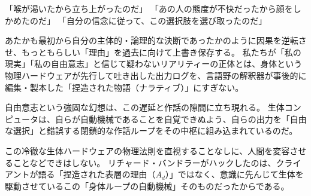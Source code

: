 「喉が渇いたから立ち上がったのだ」
「あの人の態度が不快だったから顔をしかめたのだ」
「自分の信念に従って、この選択肢を選び取ったのだ」

あたかも最初から自分の主体的・論理的な決断であったかのように因果を逆転させ、もっともらしい「理由」を過去に向けて上書き保存する。
私たちが「私の現実」「私の自由意志」と信じて疑わないリアリティーの正体とは、身体という物理ハードウェアが先行して吐き出した出力ログを、言語野の解釈器が事後的に編集・製本した「捏造された物語（ナラティブ）」にすぎない。

自由意志という強固な幻想は、この遅延と作話の隙間に立ち現れる。
生体コンピュータは、自らが自動機械であることを自覚できぬよう、自らの出力を「自由な選択」と錯誤する閉鎖的な作話ループをその中枢に組み込まれているのだ。

この冷徹な生体ハードウェアの物理法則を直視することなしに、人間を変容させることなどできはしない。
リチャード・バンドラーがハックしたのは、クライアントが語る「捏造された表層の理由（$A_d$）」ではなく、意識に先んじて生体を駆動させているこの「身体ループの自動機械」そのものだったからである。
